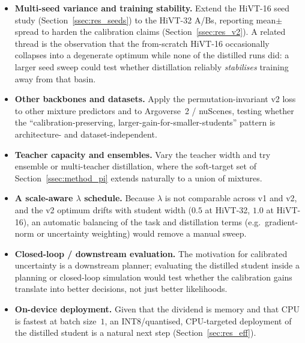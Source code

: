 \begin{itemize}[leftmargin=1.4em]
  \item \textbf{Multi-seed variance and training stability.} Extend the HiVT-16
        seed study (Section~\ref{ssec:res_seeds}) to the HiVT-32 A/Bs, reporting
        mean$\pm$spread to harden the calibration claims
        (Section~\ref{ssec:res_v2}). A related thread is the observation that the
        from-scratch HiVT-16 occasionally collapses into a degenerate optimum
        while none of the distilled runs did: a larger seed sweep could test
        whether distillation reliably \emph{stabilises} training away from that
        basin.
  \item \textbf{Other backbones and datasets.} Apply the permutation-invariant v2
        loss to other mixture predictors and to Argoverse~2 / nuScenes, testing
        whether the ``calibration-preserving, larger-gain-for-smaller-students''
        pattern is architecture- and dataset-independent.
  \item \textbf{Teacher capacity and ensembles.} Vary the teacher width and try
        ensemble or multi-teacher distillation, where the soft-target set of
        Section~\ref{ssec:method_pi} extends naturally to a union of mixtures.
  \item \textbf{A scale-aware $\lambda$ schedule.} Because $\lambda$ is not
        comparable across v1 and v2, and the v2 optimum drifts with student width
        ($0.5$ at HiVT-32, $1.0$ at HiVT-16), an automatic balancing of the task and
        distillation terms (e.g.\ gradient-norm or uncertainty weighting) would
        remove a manual sweep.
  \item \textbf{Closed-loop / downstream evaluation.} The motivation for calibrated
        uncertainty is a downstream planner; evaluating the distilled student inside
        a planning or closed-loop simulation would test whether the calibration
        gains translate into better decisions, not just better likelihoods.
  \item \textbf{On-device deployment.} Given that the dividend is memory and that
        CPU is fastest at batch size~$1$, an INT8/quantised, CPU-targeted deployment
        of the distilled student is a natural next step
        (Section~\ref{sec:res_eff}).
\end{itemize}

